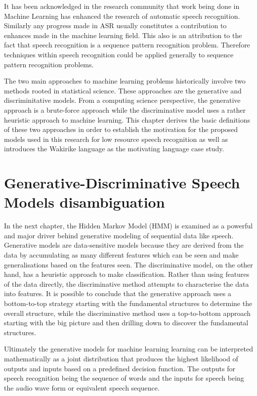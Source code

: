 It has been acknowledged in the research community \citep{2015watanabe,deng2013machine}  that work being done in Machine Learning has enhanced the research of automatic speech recognition.  Similarly any progress made in ASR usually constitutes a contribution to enhances made in the machine learning field.  This also is an attribution to the fact that speech recognition is a sequence pattern recognition problem.  Therefore techniques within speech recognition could be applied generally to sequence pattern recognition problems.

The two main approaches to machine learning problems historically involve two methods rooted in statistical science.  These approaches are the generative and discriminitative models.  From a computing science perspective, the generative approach is a brute-force approach while the discriminative model uses a rather heuristic approach to machine learning. This chapter derives the basic definitions of these two approaches in order to establish the motivation for the proposed models used in this research for low resource speech recognition as well as introduces the Wakirike language as the motivating language case study.

\section{Generative-Discriminative Speech Models disambiguation}
\pagestyle{fancy}
In the next chapter, the Hidden Markov Model (HMM) is examined as a powerful and major driver behind generative modeling of sequential data like speech.  Generative models are data-sensitive models because they are derived from the data by accumulating as many different features which can be seen and make generalisations based on the features seen. The discriminative model, on the other hand, has a heuristic approach to make classification.  Rather than using features of the data directly, the discriminative method attempts to characterise the data into features. It is possible to conclude that the generative approach uses a bottom-to-top strategy starting with the fundamental structures to determine the overall structure, while the discriminative method uses a top-to-bottom approach starting with the big picture and then drilling down to discover the fundamental structures.

Ultimately the generative models for machine learning learning can be interpreted mathematically as a joint distribution that produces the highest likelihood of outputs and inputs based on a predefined decision function.  The outputs for speech recognition being the sequence of words and the inputs for speech being the audio wave form or equivalent speech sequence.

